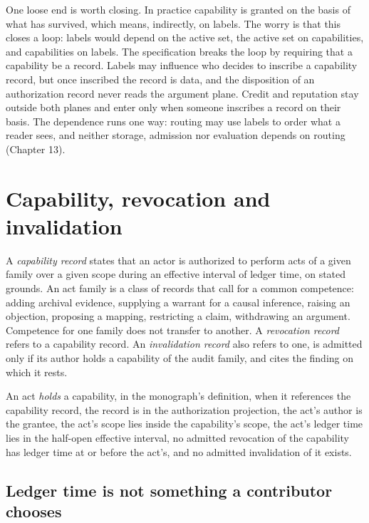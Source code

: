 \documentclass[11pt]{article}
\begin{document}
One loose end is worth closing. In practice capability is granted on the basis of what has survived, which means, indirectly, on labels. The worry is that this closes a loop: labels would depend on the active set, the active set on capabilities, and capabilities on labels. The specification breaks the loop by requiring that a capability be a record. Labels may influence who decides to inscribe a capability record, but once inscribed the record is data, and the disposition of an authorization record never reads the argument plane. Credit and reputation stay outside both planes and enter only when someone inscribes a record on their basis. The dependence runs one way: routing may use labels to order what a reader sees, and neither storage, admission nor evaluation depends on routing (Chapter 13).

\section{Capability, revocation and invalidation}\label{sec:cap}

A \emph{capability record} states that an actor is authorized to perform acts of a given family over a given scope during an effective interval of ledger time, on stated grounds. An act family is a class of records that call for a common competence: adding archival evidence, supplying a warrant for a causal inference, raising an objection, proposing a mapping, restricting a claim, withdrawing an argument. Competence for one family does not transfer to another. A \emph{revocation record} refers to a capability record. An \emph{invalidation record} also refers to one, is admitted only if its author holds a capability of the audit family, and cites the finding on which it rests.

An act \emph{holds} a capability, in the monograph's definition, when it references the capability record, the record is in the authorization projection, the act's author is the grantee, the act's scope lies inside the capability's scope, the act's ledger time lies in the half-open effective interval, no admitted revocation of the capability has ledger time at or before the act's, and no admitted invalidation of it exists.

\subsection{Ledger time is not something a contributor chooses}
\end{document}
